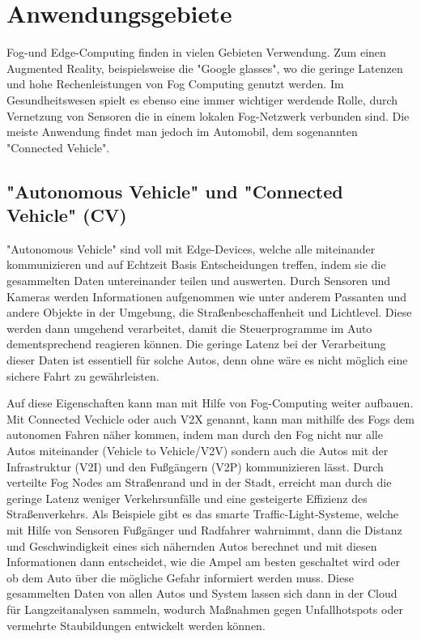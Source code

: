 \documentclass[conference]{IEEEtran}
\begin{document}
\section{Anwendungsgebiete}
Fog-und Edge-Computing finden in vielen Gebieten Verwendung. Zum einen Augmented Reality, beispielsweise die "Google glasses", wo die geringe Latenzen und hohe Rechenleistungen von Fog Computing genutzt werden. Im Gesundheitswesen spielt es ebenso eine immer wichtiger werdende Rolle, durch Vernetzung von Sensoren die in einem lokalen Fog-Netzwerk verbunden sind. Die meiste Anwendung findet man jedoch im Automobil, dem sogenannten "Connected Vehicle".

\subsection{"Autonomous Vehicle" und "Connected Vehicle" (CV)}
"Autonomous Vehicle" sind voll mit Edge-Devices, welche alle miteinander kommunizieren und auf Echtzeit Basis Entscheidungen treffen, indem sie die gesammelten Daten untereinander teilen und auswerten. Durch Sensoren und Kameras werden Informationen aufgenommen wie unter anderem Passanten und andere Objekte in der Umgebung, die Straßenbeschaffenheit und Lichtlevel. Diese werden dann umgehend verarbeitet, damit die Steuerprogramme im Auto dementsprechend reagieren können. 
Die geringe Latenz bei der Verarbeitung dieser Daten ist essentiell für solche Autos, denn ohne wäre es nicht möglich eine sichere Fahrt zu gewährleisten.

Auf diese Eigenschaften kann man mit Hilfe von Fog-Computing weiter aufbauen. Mit Connected Vechicle oder auch V2X genannt, kann man mithilfe des Fogs dem autonomen Fahren näher kommen, indem man durch den Fog nicht nur alle Autos miteinander (Vehicle to Vehicle/V2V) sondern auch die Autos mit der Infrastruktur (V2I) und den Fußgängern (V2P) kommunizieren lässt.
Durch verteilte Fog Nodes am Straßenrand und in der Stadt, erreicht man durch die geringe Latenz weniger Verkehrsunfälle und eine gesteigerte Effizienz des Straßenverkehrs.
Als Beispiele gibt es das smarte Traffic-Light-Systeme, welche mit Hilfe von Sensoren Fußgänger und Radfahrer wahrnimmt, dann die Distanz und Geschwindigkeit eines sich nähernden Autos berechnet und mit diesen Informationen dann entscheidet, wie die Ampel am besten geschaltet wird oder ob dem Auto über die mögliche Gefahr informiert werden muss.
Diese gesammelten Daten von allen Autos und System lassen sich dann in der Cloud für Langzeitanalysen sammeln, wodurch Maßnahmen gegen Unfallhotspots oder vermehrte Staubildungen entwickelt werden können.


\nocite{*}


\listoffigures
\end{document}
